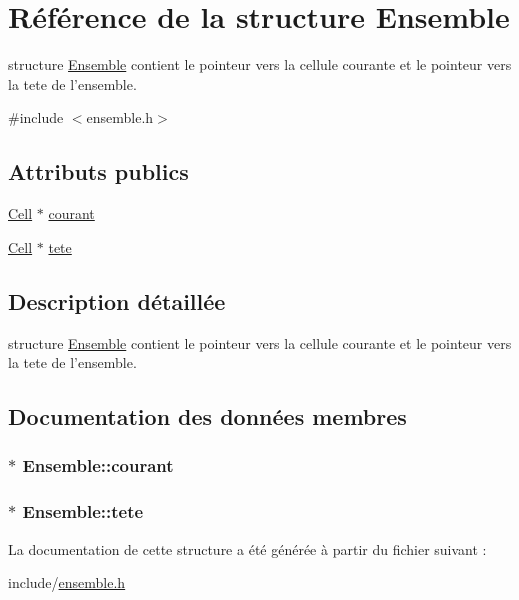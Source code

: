 \hypertarget{structEnsemble}{\section{\-Référence de la structure \-Ensemble}
\label{structEnsemble}
}


structure \hyperlink{structEnsemble}{\-Ensemble} contient le pointeur vers la cellule courante et le pointeur vers la tete de l'ensemble.  




{\ttfamily \#include $<$ensemble.\-h$>$}

\subsection*{\-Attributs publics}
\begin{DoxyCompactItemize}
\item 
\hyperlink{structCell}{\-Cell} $\ast$ \hyperlink{structEnsemble_a2962c7ff3817d074d6ffeb75f3a764b1}{courant}
\item 
\hyperlink{structCell}{\-Cell} $\ast$ \hyperlink{structEnsemble_abb1d7f65429442d3b36beceede08ff71}{tete}
\end{DoxyCompactItemize}


\subsection{\-Description détaillée}
structure \hyperlink{structEnsemble}{\-Ensemble} contient le pointeur vers la cellule courante et le pointeur vers la tete de l'ensemble. 

\subsection{\-Documentation des données membres}
\hypertarget{structEnsemble_a2962c7ff3817d074d6ffeb75f3a764b1}{
\subsubsection[{courant}]{$\ast$ {\bf \-Ensemble\-::courant}}}\label{structEnsemble_a2962c7ff3817d074d6ffeb75f3a764b1}
\hypertarget{structEnsemble_abb1d7f65429442d3b36beceede08ff71}{
\subsubsection[{tete}]{$\ast$ {\bf \-Ensemble\-::tete}}}\label{structEnsemble_abb1d7f65429442d3b36beceede08ff71}


\-La documentation de cette structure a été générée à partir du fichier suivant \-:\begin{DoxyCompactItemize}
\item 
include/\hyperlink{ensemble_8h}{ensemble.\-h}\end{DoxyCompactItemize}
